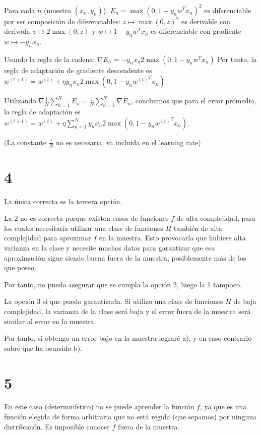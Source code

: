 \documentclass{article}
\begin{document}
Para cada \(n\) (muestra \((x_n,y_n)\)), \(E_n=\max(0,1-y_nw^Tx_n)^2\)
es diferenciable por ser composición de diferenciables:
\(z\mapsto\max(0,z)^2\) es derivable con derivada
\(z\mapsto 2\max(0,z)\) y \(w\mapsto 1-y_nw^Tx_n\) es diferenciable
con gradiente \(w\mapsto -y_nx_n\).

Usando la regla de la cadena:
\(\nabla E_n=-y_nx_n2\max(0,1-y_nw^Tx_n)\) Por tanto, la regla de
adaptación de gradiente descendente es
\(w^{(t+1)}=w^{(t)}+\eta y_nx_n2\max(0,1-y_n{w^{(t)}}^Tx_n)\).

Utilizando
\(\nabla\frac{1}{N}\sum_{n=1}^N E_n=\frac{1}{N}\sum_{n=1}^N \nabla 
E_n\), concluimos que para el error promedio, la regla de adaptación
es
\(w^{(t+1)}=w^{(t)}+\eta \sum_{n=1}^N
y_nx_n2\max(0,1-y_n{w^{(t)}}^Tx_n)\).

(La constante \(\frac{1}{N}\) no es necesaria, va incluida en el
learning rate)

\section{4}

La única correcta es la tercera opción.

La 2 no es correcta porque existen casos de funciones \(f\) de alta complejidad, para los cuales necesitaría utilizar una clase de funciones \(H\) también de alta complejidad para aproximar \(f\) en la muestra. Esto provocaría que hubiese alta varianza en la clase y necesite muchos datos para garantizar que esa aproximación sigue siendo buena fuera de la muestra, posiblemente más de los que poseo.

Por tanto, no puedo asegurar que se cumpla la opción 2, luego la 1 tampoco.

La opción 3  sí que puedo garantizarla. Si utilizo una clase de funciones \(H\) de baja complejidad, la varianza de la clase será baja y el error fuera de la muestra será similar al error en la muestra.

Por tanto, si obtengo un error bajo en la muestra lograré a), y en caso contrario sabré que ha ocurrido b).

\section{5}

En este caso (determinístico) no se puede aprender la función \(f\),
ya que es una función elegida de forma arbitraria que no está regida
(que sepamos) por ninguna distribución. Es imposible conocer \(f\)
fuera de la muestra.
\end{document}
